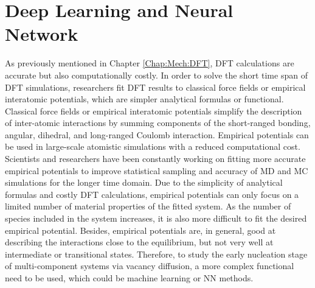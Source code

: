 \section{Deep Learning and Neural Network}
\label{Chap:Mech:NN}

As previously mentioned in Chapter \ref{Chap:Mech:DFT}, \ac{DFT} calculations are accurate but also computationally costly. In order to solve the short time span of \ac{DFT} simulations, researchers fit \ac{DFT} results to classical force fields or empirical interatomic potentials, which are simpler analytical formulas or functional. Classical force fields or empirical interatomic potentials simplify the description of inter-atomic interactions by summing components of the short-ranged bonding\cite{jones1924determination}, angular\cite{justo1998interatomic}, dihedral\cite{cornell1995second}, and long-ranged Coulomb interaction\cite{liang2013classical}. Empirical potentials can be used in large-scale atomistic simulations with a reduced computational cost. Scientists and researchers have been constantly working on fitting more accurate empirical potentials to improve statistical sampling and accuracy of \ac{MD} and \ac{MC} simulations for the longer time domain. Due to the simplicity of analytical formulas and costly \ac{DFT} calculations, empirical potentials can only focus on a limited number of material properties of the fitted system. As the number of species included in the system increases, it is also more difficult to fit the desired empirical potential. Besides, empirical potentials are, in general, good at describing the interactions close to the equilibrium, but not very well at intermediate or transitional states. Therefore, to study the early nucleation stage of multi-component systems via vacancy diffusion, a more complex functional need to be used, which could be machine learning or \acf{NN} methods.

